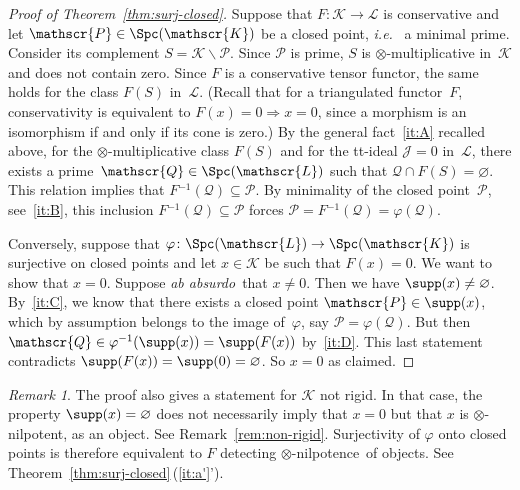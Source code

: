 \documentclass{amsart}
\numberwithin{equation}{section}
\theoremstyle{remark}
\newtheorem{Rem}[equation]{Remark}
\begin{document}
\begin{proof}[Proof of Theorem~\ref{thm:surj-closed}]
Suppose that $F\colon{\mathscr{{K}}}\to {\mathscr{{L}}}$ is conservative and let ${{\mathscr{{P}}}}\in{\Spc({\mathscr{K}})}$ be a closed point, {{\sl i.e.}\ } a minimal prime. Consider its complement $S={\mathscr{{K}}}{\!\smallsetminus\!}{{\mathscr{{P}}}}$. Since ${{\mathscr{{P}}}}$ is prime, $S$ is $\otimes$-multiplicative in~${\mathscr{{K}}}$ and does not contain zero. Since $F$ is a conservative tensor functor, the same holds for the class $F(S)$ in~${\mathscr{{L}}}$. (Recall that for a triangulated functor~$F$, conservativity is equivalent to $F(x)=0{\Rightarrow} x=0$, since a morphism is an isomorphism if and only if its cone is zero.) By the general fact~\eqref{it:A} recalled above, for the $\otimes$-multiplicative class $F(S)$ and for the tt-ideal ${\mathscr{{J}}}=0$ in~${\mathscr{{L}}}$, there exists a prime~${{\mathscr{{Q}}}}\in{\Spc({\mathscr{L}})}$ such that ${{\mathscr{{Q}}}}\cap F(S)=\varnothing$. This relation implies that $F{^{-1}}({{\mathscr{{Q}}}})\subseteq {{\mathscr{{P}}}}$. By minimality of the closed point~${{\mathscr{{P}}}}$, see~\eqref{it:B}, this inclusion $F{^{-1}}({{\mathscr{{Q}}}})\subseteq {{\mathscr{{P}}}}$ forces ${{\mathscr{{P}}}}=F{^{-1}}({{\mathscr{{Q}}}})=\varphi({{\mathscr{{Q}}}})$.

Conversely, suppose that $\varphi\colon{\Spc({\mathscr{L}})}\to {\Spc({\mathscr{K}})}$ is surjective on closed points and let $x\in{\mathscr{{K}}}$ be such that $F(x)=0$. We want to show that $x=0$. Suppose {{\sl ab absurdo}}\ that $x\neq 0$. Then we have $\supp(x)\neq\varnothing$. By~\eqref{it:C}, we know that there exists a closed point ${{\mathscr{{P}}}}\in\supp(x)$, which by assumption belongs to the image of~$\varphi$, say ${{\mathscr{{P}}}}=\varphi({{\mathscr{{Q}}}})$. But then ${{\mathscr{{Q}}}}\in\varphi{^{-1}}(\supp(x))=\supp(F(x))$ by~\eqref{it:D}. This last statement contradicts $\supp(F(x))=\supp(0)=\varnothing$. So $x=0$ as claimed.
\end{proof}

\begin{Rem}
The proof also gives a statement for ${\mathscr{{K}}}$ not rigid. In that case, the property $\supp(x)=\varnothing$ does not necessarily imply that $x=0$ but that $x$ is {$\otimes$-nilpotent}, as an object. See Remark~\ref{rem:non-rigid}. Surjectivity of $\varphi$ onto closed points is therefore equivalent to $F$ detecting {$\otimes$-nilpotence}\ of objects. See Theorem~\ref{thm:surj-closed}\,(\ref{it:a'}').
\end{Rem}
\end{document}

